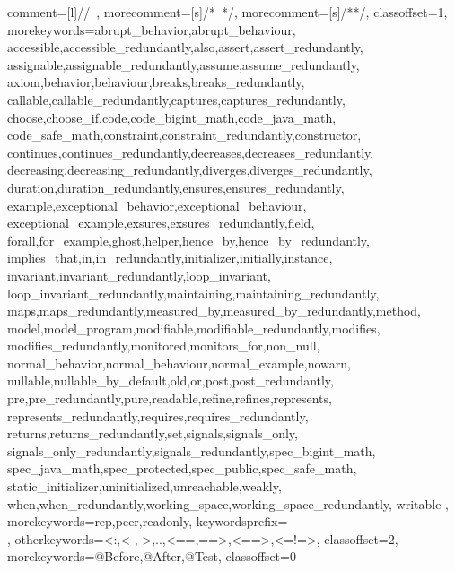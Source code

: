        {%
        comment=[l]{//\ },
        morecomment=[s]{/*\ }{*/},
        morecomment=[s]{/*}{*/},
        classoffset=1,
        morekeywords={abrupt_behavior,abrupt_behaviour,
         accessible,accessible_redundantly,also,assert,assert_redundantly,
         assignable,assignable_redundantly,assume,assume_redundantly,
         axiom,behavior,behaviour,breaks,breaks_redundantly,
         callable,callable_redundantly,captures,captures_redundantly,
         choose,choose_if,code,code_bigint_math,code_java_math,
         code_safe_math,constraint,constraint_redundantly,constructor,
         continues,continues_redundantly,decreases,decreases_redundantly,
         decreasing,decreasing_redundantly,diverges,diverges_redundantly,
         duration,duration_redundantly,ensures,ensures_redundantly,
         example,exceptional_behavior,exceptional_behaviour,
         exceptional_example,exsures,exsures_redundantly,field,
         forall,for_example,ghost,helper,hence_by,hence_by_redundantly,
         implies_that,in,in_redundantly,initializer,initially,instance,
         invariant,invariant_redundantly,loop_invariant,
         loop_invariant_redundantly,maintaining,maintaining_redundantly,
         maps,maps_redundantly,measured_by,measured_by_redundantly,method,
         model,model_program,modifiable,modifiable_redundantly,modifies,
         modifies_redundantly,monitored,monitors_for,non_null,
         normal_behavior,normal_behaviour,normal_example,nowarn,
         nullable,nullable_by_default,old,or,post,post_redundantly,
         pre,pre_redundantly,pure,readable,refine,refines,represents,
         represents_redundantly,requires,requires_redundantly,
         returns,returns_redundantly,set,signals,signals_only,
         signals_only_redundantly,signals_redundantly,spec_bigint_math,
         spec_java_math,spec_protected,spec_public,spec_safe_math,
         static_initializer,uninitialized,unreachable,weakly,
         when,when_redundantly,working_space,working_space_redundantly,
         writable
        },
        morekeywords={rep,peer,readonly},
        keywordsprefix=\\,
        otherkeywords={<:,<-,->,..,<==,==>,<==>,<=!=>},
        classoffset=2,
        morekeywords={@Before,@After,@Test},
        classoffset=0 %
}

